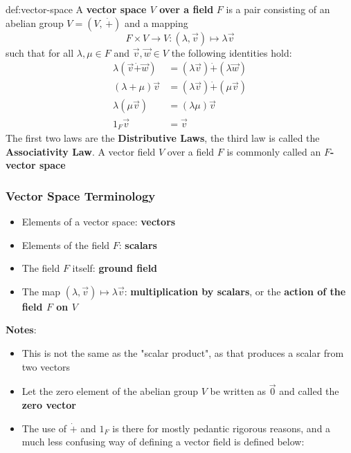 \documentclass{article}
\begin{document}
\begin{dfn}{def:vector-space}{}
    A \textbf{vector space $V$ over a field} $F$ is a pair consisting of an abelian group $V = (V,\, \dot{+})$ and a mapping
    \[F \times V \to V : (\lambda, \vec{v})\mapsto \lambda \vec{v}\]
    such that for all $\lambda, \mu \in F$ and $\vec{v}, \vec{w}\in V$ the following identities hold:
    \begin{align*}
        \lambda(\vec{v} \dot{+} \vec{w}) &= (\lambda\vec{v}) \dot{+} (\lambda \vec{w})\\
        (\lambda + \mu)\vec{v} &= (\lambda \vec{v}) \dot{+} (\mu \vec{v})\\
        \lambda (\mu \vec{v}) &= (\lambda \mu) \vec{v}\\
        1_{F}\vec{v} &= \vec{v}
    \end{align*}
    The first two laws are the \textbf{Distributive Laws}, the third law is called the \textbf{Associativity Law}. A vector field $V$ over a field $F$ is commonly called an \textbf{$F$-vector space}
\end{dfn}

\newpage

\subsubsection{Vector Space Terminology}
\begin{itemize}
    \item Elements of a vector space: \textbf{vectors}
    \item Elements of the field $F$: \textbf{scalars}
    \item The field $F$ itself: \textbf{ground field}
    \item The map $(\lambda, \vec{v})\mapsto \lambda\vec{v}$: \textbf{multiplication by scalars}, or the \textbf{action of the field $F$ on $V$}
\end{itemize}

\textbf{Notes}:
\begin{itemize}
    \item This is not the same as the "scalar product", as that produces a scalar from two vectors
    \item Let the zero element of the abelian group $V$ be written as $\vec{0}$ and called the \textbf{zero vector}
    \item The use of $\dot{+}$ and $1_{F}$ is there for mostly pedantic rigorous reasons, and a much less confusing way of defining a vector field is defined below:
\end{itemize}
\end{document}
